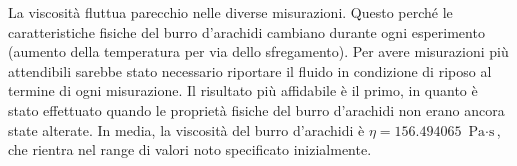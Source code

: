 La viscosit\`{a} fluttua parecchio nelle diverse misurazioni. Questo perch\'{e} le caratteristiche fisiche del burro d'arachidi 
cambiano durante ogni esperimento (aumento della temperatura per via dello sfregamento). Per avere misurazioni pi\`{u} attendibili 
sarebbe stato necessario riportare il fluido in condizione di riposo al termine di ogni misurazione. Il risultato pi\`{u} affidabile 
\`{e} il primo, in quanto \`{e} stato effettuato quando le propriet\`{a} fisiche del burro d'arachidi non erano ancora 
state alterate.
In media, la viscosit\`{a} del burro d'arachidi \`{e} $\eta = 156.494065$ $\text{Pa} \cdot \text{s}$, che rientra nel range di 
valori noto specificato inizialmente. 
